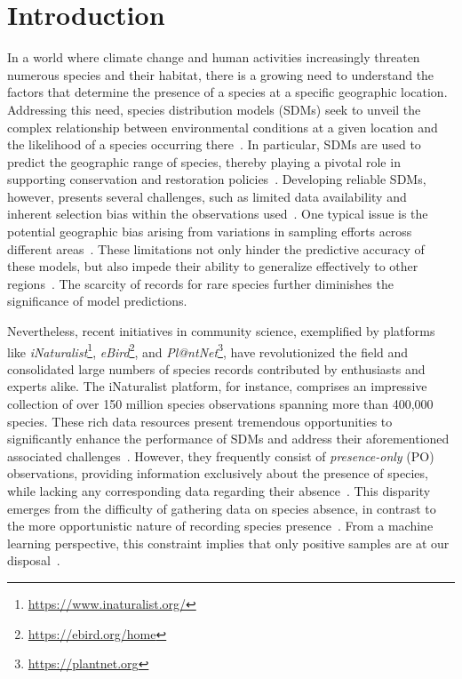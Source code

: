 \documentclass[3p,preprint,12pt]{elsarticle}
\begin{document}
\begin{frontmatter}
  \end{frontmatter}
  
\section{Introduction}

In a world where climate change and human activities increasingly threaten numerous species and their habitat, there is a growing need to understand the factors that determine the presence of a species at a specific geographic location. Addressing this need,  species distribution models (SDMs) seek to unveil the complex relationship between environmental conditions at a given location and the likelihood of a species occurring there~\citep{elith2009species, franklin2010mapping}. In particular, SDMs are used to predict the geographic range of species, thereby playing a pivotal role in supporting conservation and restoration policies~\citep{guisan2013predicting, sofaer2019development}.
Developing reliable SDMs, however, presents several challenges, such as limited data availability and inherent selection bias within the observations used~\citep{beck2014bias, mesaglio2021overview}. One typical issue is the potential geographic bias arising from variations in sampling efforts across different areas~\citep{kadmon2004effect}. These limitations not only hinder the predictive accuracy of these models, but also impede their ability to generalize effectively to other regions~\citep{elith2010art}. The scarcity of records for rare species further diminishes the significance of model predictions. %

Nevertheless, recent initiatives in community science, exemplified by platforms like \textit{iNaturalist}\footnote{\href{https://www.inaturalist.org/}{https://www.inaturalist.org/}}, \textit{eBird}\footnote{\href{https://ebird.org/home}{https://ebird.org/home}}, and \textit{Pl@ntNet}\footnote{\href{https://plantnet.org}{https://plantnet.org}}, have revolutionized the field and consolidated large numbers of species records contributed by enthusiasts and experts alike. The iNaturalist platform, for instance, comprises an impressive collection of over 150 million species observations spanning more than 400,000 species. These rich data resources present tremendous opportunities to significantly enhance the performance of SDMs and address their aforementioned associated challenges~\citep{botella2023geolifeclef2023, teng2023satbird}.
However, they frequently consist of \textit{presence-only} (PO) observations, providing information exclusively about the presence of species, while lacking any corresponding data regarding their absence~\citep{pearce2006modelling, elith2020presence}. This disparity emerges from the difficulty of gathering data on species absence, in contrast to the more opportunistic nature of recording species presence~\citep{franklin2010mapping}. From a machine learning perspective, this constraint implies that only positive samples are at our disposal~\citep{bekker2020learning}.
\end{document}
